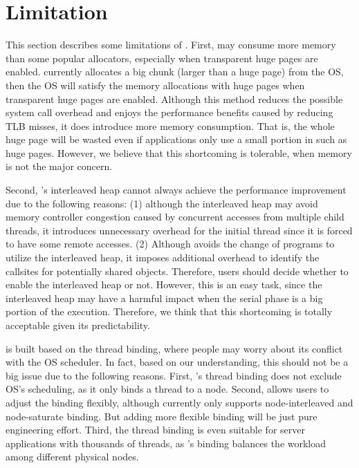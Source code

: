 \section{Limitation}
\label{sec:limit}

This section describes some limitations of \NM{}. First, \NM{} may consume more memory than some popular allocators, especially when transparent huge pages are enabled. \NM{} currently allocates a big chunk (larger than a huge page) from the OS, then the OS will satisfy the memory allocations with huge pages when transparent huge pages are enabled. Although this method reduces the possible system call overhead and enjoys the performance benefits caused by reducing TLB misses, it does introduce more memory consumption. That is, the whole huge page will be wasted even if applications only use a small portion in such as huge pages. However, we believe that this shortcoming is tolerable, when memory is not the major concern. 


Second, \NM{}'s interleaved heap cannot always achieve the performance improvement due to the following reasons: (1) although the interleaved heap may avoid memory controller congestion caused by concurrent accesses from multiple child threads, it introduces unnecessary overhead for the initial thread since it is forced to have some remote accesses. (2) Although \NM{} avoids the change of programs to utilize the interleaved heap, it imposes additional overhead to identify the callsites for potentially shared objects. Therefore, users should decide whether to enable the interleaved heap or not. However, this is an easy task, since the interleaved heap may have a harmful impact when the serial phase is a big portion of the execution. Therefore, we think that this shortcoming is totally acceptable given its predictability. 

\NM{} is built based on the thread binding, where people may worry about its conflict with the OS scheduler. In fact, based on our understanding, this should not be a big issue due to the following reasons. First, \NM{}'s thread binding does not exclude OS's scheduling, as it only binds a thread to a node. Second, \NM{} allows users to adjust the binding flexibly, although currently \NM{} only supports node-interleaved and node-saturate binding. But adding more flexible binding will be just pure engineering effort. Third, the thread binding is even suitable for server applications with thousands of threads, as \NM{}'s binding balances the workload among different physical nodes. 

